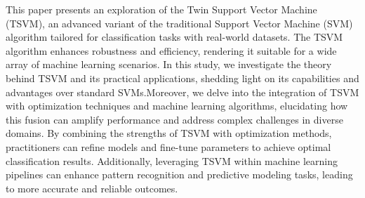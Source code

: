 
\begin{Abstrakt}
    This paper presents an exploration of the Twin Support Vector Machine (TSVM), an advanced variant of the traditional Support Vector Machine (SVM) algorithm tailored for classification tasks with real-world datasets. The TSVM algorithm enhances robustness and efficiency, rendering it suitable for a wide array of machine learning scenarios. In this study, we investigate the theory behind TSVM and its practical applications, shedding light on its capabilities and advantages over standard SVMs.\newline Moreover, we delve into the integration of TSVM with optimization techniques and machine learning algorithms, elucidating how this fusion can amplify performance and address complex challenges in diverse domains. By combining the strengths of TSVM with optimization methods, practitioners can refine models and fine-tune parameters to achieve optimal classification results. Additionally, leveraging TSVM within machine learning pipelines can enhance pattern recognition and predictive modeling tasks, leading to more accurate and reliable outcomes.
\end{Abstrakt}



\clearpage